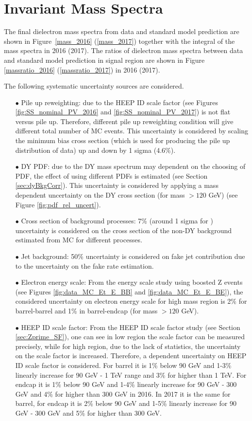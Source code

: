 \clearpage
\section{Invariant Mass Spectra}
\label{sec:results}

The final dielectron mass spectra from data and standard model prediction are shown in Figure~\ref{mass_2016} (\ref{mass_2017}) together with the integral of the mass spectra in 2016 (2017).
The ratios of dielectron mass spectra between data and standard model prediction in signal region are shown in Figure \ref{massratio_2016} (\ref{massratio_2017}) in 2016 (2017).

The following systematic uncertainty sources are considered.

\begin{itemize}
  \item[$\bullet$] Pile up reweighting: due to the HEEP ID scale factor (see Figures \ref{fig:SS_nominal_PV_2016} and \ref{fig:SS_nominal_PV_2017}) is not flat versus pile up. Therefore, different pile up reweighting condition will give different total number of MC events. This uncertainty is considered by scaling the minimum bias cross section (which is used for producing the pile up distribution of data) up and down by 1 sigma (4.6\%).
  \item[$\bullet$] DY PDF: due to the DY mass spectrum may dependent on the choosing of PDF, the effect of using different PDFs is estimated (see Section \ref{sec:dyBkgCorr}). This uncertainty is considered by applying a mass dependent uncertainty on the DY cross section (for mass $>120$ GeV) (see Figure \ref{fig:pdf_rel_uncert}).
  \item[$\bullet$] Cross section of background processes: 7\% (around 1 sigma for \ttbar) uncertainty is considered on the cross section of the non-DY background estimated from MC for different processes.
  \item[$\bullet$] Jet background: 50\% uncertainty is considered on fake jet contribution due to the uncertainty on the fake rate estimation.
  \item[$\bullet$] Electron energy scale: From the energy scale study using boosted Z events (see Figures \ref{fig:data_MC_Et_E_BB} and \ref{fig:data_MC_Et_E_BE}), the considered uncertainty on electron energy scale for high mass region is 2\% for barrel-barrel and 1\% in barrel-endcap (for mass $>120$ GeV).
  \item[$\bullet$] HEEP ID scale factor: From the HEEP ID scale factor study (see Section \ref{sec:Zprime_SF}), one can see in low \et region the scale factor can be measured precisely, while for high \et region, due to the lack of statistics, the uncertainty on the scale factor is increased. Therefore, a \et dependent uncertainty on HEEP ID scale factor is considered. For barrel it is 1\%  below 90 GeV and 1-3\% linearly increase for 90 GeV - 1 TeV range and 3\% for higher than 1 TeV. For endcap it is 1\% below 90 GeV and 1-4\% linearly increase for 90 GeV - 300 GeV and 4\% for higher than 300 GeV in 2016. In 2017 it is the same for barrel, for endcap it is 2\% below 90 GeV and 1-5\% linearly increase for 90 GeV - 300 GeV and 5\% for higher than 300 GeV.

\end{itemize}
